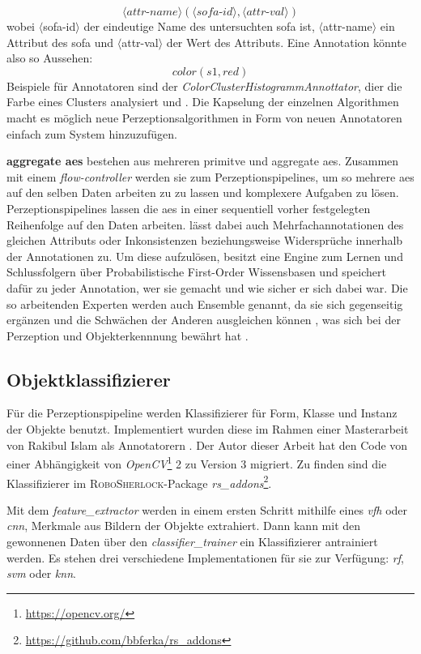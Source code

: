 \begin{displaymath}
\langle attr\text{-}name \rangle (\langle sofa\text{-}id \rangle , \langle attr\text{-}val \rangle)
\end{displaymath}
wobei $\langle$sofa-id$\rangle$ der eindeutige Name des untersuchten \gls{sofa} ist, $\langle$attr-name$\rangle$ ein Attribut des \gls{sofa} und $\langle$attr-val$\rangle$ der Wert des Attributs. Eine Annotation könnte also so Aussehen: 
\begin{displaymath}
color(s1, red)
\end{displaymath}
Beispiele für Annotatoren sind der \textit{ColorClusterHistogrammAnnottator}, dier die Farbe eines Clusters analysiert und . Die Kapselung der einzelnen Algorithmen macht es möglich neue Perzeptionsalgorithmen in Form von neuen Annotatoren einfach zum System hinzuzufügen. \par
\textbf{aggregate \glspl{ae}} bestehen aus mehreren primitve und aggregate \glspl{ae}. Zusammen mit einem \textit{flow-controller} werden sie zum Perzeptionspipelines, um so mehrere \glspl{ae} auf den selben Daten arbeiten zu zu lassen und komplexere Aufgaben zu lösen. Perzeptionspipelines lassen die \glspl{ae} in einer sequentiell vorher festgelegten Reihenfolge auf den Daten arbeiten. \robosherlock lässt dabei auch Mehrfachannotationen des gleichen Attributs oder Inkonsistenzen beziehungsweise Widersprüche innerhalb der Annotationen zu. Um diese aufzulösen, besitzt \robosherlock eine Engine zum Lernen und Schlussfolgern über Probabilistische First-Order Wissensbasen und speichert dafür zu jeder Annotation, wer sie gemacht und wie sicher er sich dabei war. Die so arbeitenden Experten werden auch Ensemble genannt, da sie sich gegenseitig ergänzen und die Schwächen der Anderen ausgleichen können \cite{polikar}, was sich bei der Perzeption und Objekterkennnung bewährt hat \cite{multimodalTemplate, atrBasedObjIden, pronobis1, pr2looking}.  
  
\subsection{Objektklassifizierer}
\label{sec:classifiers}
Für die Perzeptionspipeline werden Klassifizierer für Form, Klasse und Instanz der Objekte benutzt. Implementiert wurden diese im Rahmen einer Masterarbeit von Rakibul Islam als \robosherlock Annotatorern \cite{rakib}. Der Autor dieser Arbeit hat den Code von einer Abhängigkeit von \textit{OpenCV}\footnote{\url{https://opencv.org/}} 2 zu Version 3 migriert. Zu finden sind die Klassifizierer im \textsc{RoboSherlock}-Package \textit{rs\_addons}\footnote{\url{https://github.com/bbferka/rs\_addons}}. \par
Mit dem \textit{feature\_extractor} werden in einem ersten Schritt mithilfe eines \textit{\gls{vfh}} oder \textit{\gls{cnn}}, Merkmale aus Bildern der Objekte extrahiert. Dann kann mit den gewonnenen Daten über den \textit{classifier\_trainer} ein Klassifizierer antrainiert werden. Es stehen drei verschiedene Implementationen für sie zur Verfügung: \textit{\gls{rf}}, \textit{\gls{svm}} oder \textit{\gls{knn}}.

